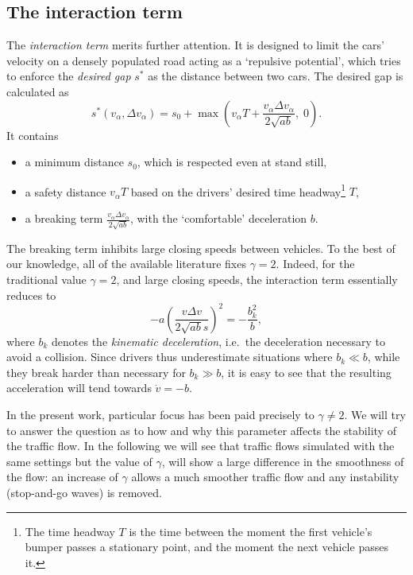 \subsection{The interaction term}
\label{sec:interaction}
The \emph{interaction term} merits further attention. It is designed to limit the cars' velocity on a densely populated road acting as a `repulsive potential', which tries to enforce the \emph{desired gap} $s^*$ as the distance between two cars. The desired gap is calculated as
\begin{equation}
s^*(v_\alpha, \Delta v_\alpha) = s_0 + \max\left(v_\alpha T + \frac{v_\alpha \Delta v_\alpha}{2\sqrt{ab}},\;0\right).
\label{eq:desired_gap}
\end{equation}
It contains
\begin{itemize}
    \item a minimum distance $s_0$, which is respected even at stand still,
    \item a safety distance $v_\alpha T$ based on the drivers' desired time headway\footnote{The time headway $T$ is the time between the moment the first vehicle's bumper passes a stationary point, and the moment the next vehicle passes it.} $T$,
    \item a breaking term $\frac{v_\alpha \Delta v_\alpha}{2\sqrt{ab}}$, with the `comfortable' deceleration $b$.
\end{itemize}
The breaking term inhibits large closing speeds between vehicles. To the best of our knowledge, all of the available literature fixes $\gamma=2$. Indeed, for the traditional value $\gamma=2$, and large closing speeds, the interaction term essentially reduces to 
\begin{equation}
    -a \left(\frac{v \Delta v}{2 \sqrt{a b}s}\right)^2 = -\frac{b_k^2}{b},
    \label{eq:decel}
\end{equation}
where $b_k$ denotes the \emph{kinematic deceleration}, i.e.\ the deceleration necessary to avoid a collision. Since drivers thus underestimate situations where $b_k\ll b$, while they break harder than necessary for $b_k\gg b$, it is easy to see that the resulting acceleration will tend towards $\dot v = -b$. \cite{treiber2000}

In the present work, particular focus has been paid precisely to  $\gamma \neq 2$. We will try to answer the question as to how and why this parameter affects the stability of the traffic flow. In the following we will see that traffic flows simulated with the same settings but the value of $\gamma$, will show a large difference in the smoothness of the flow: an increase of $\gamma$ allows a much smoother traffic flow and any instability (stop-and-go waves) is removed.


